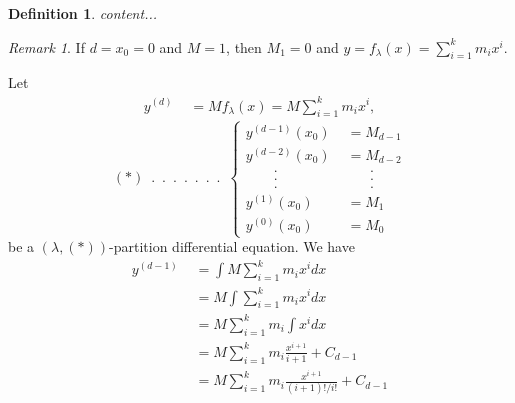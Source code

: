 \documentclass[11pt]{amsart}
\newtheorem{definition}[theorem]{Definition}
\theoremstyle{remark}
\newtheorem{remark}[theorem]{Remark}
\theoremstyle{definition}
\theoremstyle{remark}
\numberwithin{equation}{section}
\begin{document}
\begin{definition}
	content...
\end{definition}




















\vspace{1cm}








\begin{remark}
If $d=x_0=0$ and $M=1$, then $M_1=0$ and $y=f_\lambda(x)= \sum_{i=1}^{k}  m_i x^{i}$.
\end{remark}


Let 
\begin{align*}
y^{(d)}	& \,\, = M f_\lambda(x)= M \sum_{i=1}^{k}  m_i x^{i},
\end{align*}	
\begin{equation*}
(*)   \,\,\, . \,\,\, . \,\,\, . \,\,\, . \,\,\, . \,\,\, . \,\,\, . \,\,\,
\begin{cases}
	y^{(d-1)}(x_0)	& \,\, = M_{d-1} \\
	y^{(d-2)}(x_0)	& \,\, =  M_{d-2}\\
	\quad \quad .	& \quad \quad . \\
	\quad \quad .	& \quad \quad . \\
	\quad \quad .	& \quad \quad . \\
	y^{(1)}(x_0)	& \,\, =  M_1\\
	y^{(0)}(x_0)	& \,\, = M_0 
\end{cases}       
\end{equation*} be  a  $(\lambda,(*))$-partition differential equation.
We have 
\begin{align*}
y^{(d-1)}	& \,\, =  \int M \sum_{i=1}^{k}  m_i x^{i} dx\\
& \,\, = M \int  \sum_{i=1}^{k}  m_i x^{i} dx\\
& \,\, = M  \sum_{i=1}^{k}  m_i \int x^{i} dx\\
& \,\, = M  \sum_{i=1}^{k}  m_i   \frac{x^{i+1}}{i+1} + C_{d-1}\\
& \,\, = M   \sum_{i=1}^{k}  m_i   \frac{x^{i+1}}{(i+1)!/i!} + C_{d-1}\\
\end{align*}	
\end{document}
